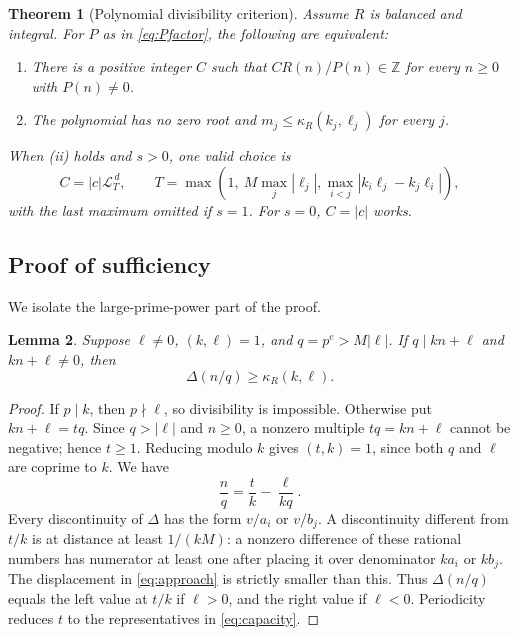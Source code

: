 \documentclass[11pt]{article}
\newtheorem{theorem}{Theorem}[section]
\newtheorem{lemma}[theorem]{Lemma}
\theoremstyle{definition}
\theoremstyle{remark}
\newcommand{\Z}{\mathbb Z}
\newcommand{\LL}{\mathcal L}
\begin{document}
\begin{theorem}[Polynomial divisibility criterion]\label{thm:criterion}
Assume $R$ is balanced and integral. For $P$ as in \eqref{eq:Pfactor},
the following are equivalent:
\begin{enumerate}[label=(\roman*),itemsep=2pt]
\item There is a positive integer $C$ such that
$CR(n)/P(n)\in\Z$ for every $n\geq0$ with $P(n)\ne0$.
\item The polynomial has no zero root and
$m_j\leq\kappa_R(k_j,\ell_j)$ for every $j$.
\end{enumerate}
When (ii) holds and $s>0$, one valid choice is
\begin{equation}\label{eq:Cbound}
 C=|c|\LL_T^{\,d},\qquad
 T=\max\left(1,\ M\max_j|\ell_j|,
    \max_{i<j}|k_i\ell_j-k_j\ell_i|\right),
\end{equation}
with the last maximum omitted if $s=1$.
For $s=0$, $C=|c|$ works.
\end{theorem}

\subsection{Proof of sufficiency}
We isolate the large-prime-power part of the proof.

\begin{lemma}\label{lem:large}
Suppose $\ell\ne0$, $(k,\ell)=1$, and $q=p^e>M|\ell|$. If
$q\mid kn+\ell$ and $kn+\ell\ne0$, then
\[
 \Delta(n/q)\geq\kappa_R(k,\ell).
\]
\end{lemma}
\begin{proof}
If $p\mid k$, then $p\nmid\ell$, so divisibility is impossible.
Otherwise put $kn+\ell=tq$. Since $q>|\ell|$ and $n\geq0$, a nonzero
multiple $tq=kn+\ell$ cannot be negative; hence $t\geq1$.
Reducing modulo $k$ gives $(t,k)=1$, since both $q$ and $\ell$ are
coprime to $k$. We have
\begin{equation}\label{eq:approach}
 \frac{n}{q}=\frac{t}{k}-\frac{\ell}{kq}.
\end{equation}
Every discontinuity of $\Delta$ has the form $v/a_i$ or $v/b_j$.
A discontinuity different from $t/k$ is at distance at least
$1/(kM)$: a nonzero difference of these rational numbers has numerator
at least one after placing it over denominator $ka_i$ or $kb_j$.
The displacement in \eqref{eq:approach} is strictly smaller than this.
Thus $\Delta(n/q)$ equals the left value at $t/k$ if $\ell>0$, and
the right value if $\ell<0$. Periodicity reduces $t$ to the
representatives in \eqref{eq:capacity}.
\end{proof}
\end{document}
